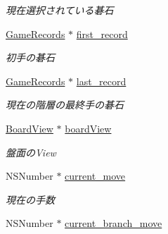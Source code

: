 \begin{DoxyCompactItemize}
\begin{DoxyCompactList}\small\item\em 現在選択されている碁石 \end{DoxyCompactList}\item 
\hypertarget{interface_games_adf535cb37946a3be379ef00e240594a4}{
\hyperlink{interface_game_records}{GameRecords} $\ast$ \hyperlink{interface_games_adf535cb37946a3be379ef00e240594a4}{first\_\-record}}
\label{interface_games_adf535cb37946a3be379ef00e240594a4}

\begin{DoxyCompactList}\small\item\em 初手の碁石 \end{DoxyCompactList}\item 
\hypertarget{interface_games_a923707c0c4aefa34a61b168ba560184a}{
\hyperlink{interface_game_records}{GameRecords} $\ast$ \hyperlink{interface_games_a923707c0c4aefa34a61b168ba560184a}{last\_\-record}}
\label{interface_games_a923707c0c4aefa34a61b168ba560184a}

\begin{DoxyCompactList}\small\item\em 現在の階層の最終手の碁石 \end{DoxyCompactList}\item 
\hypertarget{interface_games_a2679abfcd824a28c617292efccfc610b}{
\hyperlink{interface_board_view}{BoardView} $\ast$ \hyperlink{interface_games_a2679abfcd824a28c617292efccfc610b}{boardView}}
\label{interface_games_a2679abfcd824a28c617292efccfc610b}

\begin{DoxyCompactList}\small\item\em 盤面のView \end{DoxyCompactList}\item 
\hypertarget{interface_games_a17ce505b2339650db82c94e99c40e52a}{
NSNumber $\ast$ \hyperlink{interface_games_a17ce505b2339650db82c94e99c40e52a}{current\_\-move}}
\label{interface_games_a17ce505b2339650db82c94e99c40e52a}

\begin{DoxyCompactList}\small\item\em 現在の手数 \end{DoxyCompactList}\item 
\hypertarget{interface_games_aadd53bb8402e64bfb25c9e847cce4b35}{
NSNumber $\ast$ \hyperlink{interface_games_aadd53bb8402e64bfb25c9e847cce4b35}{current\_\-branch\_\-move}}
\label{interface_games_aadd53bb8402e64bfb25c9e847cce4b35}


\end{DoxyCompactItemize}
